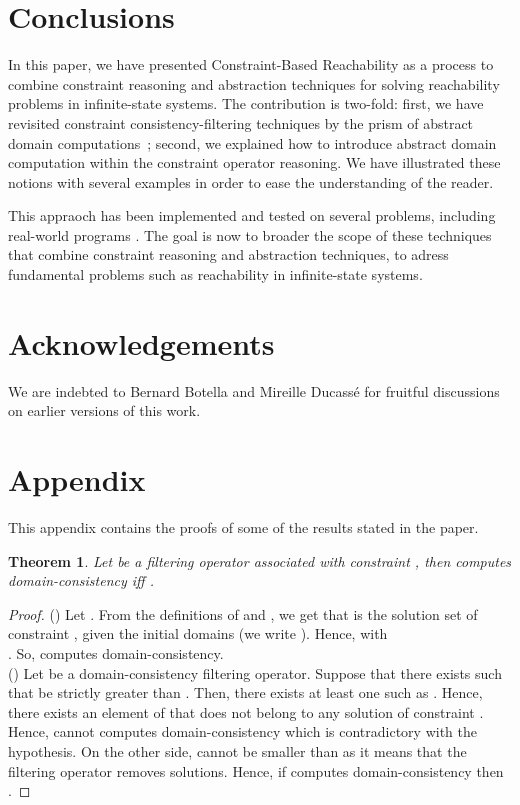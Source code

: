 \documentclass[submission,copyright,creativecommons]{eptcs}
\newtheorem{theorem}{Theorem}
\newtheorem{proof}{Proof}
\begin{document}
\section{Conclusions}

In this paper, we have presented Constraint-Based Reachability as a process to combine constraint reasoning and abstraction techniques for solving reachability problems in infinite-state systems. The contribution is two-fold: first, we have revisited constraint consistency-filtering techniques by the prism of abstract domain computations~; second, we explained how to introduce abstract domain computation within the  constraint operator reasoning. We have illustrated these notions with several examples in order to ease the understanding of the reader.

This appraoch has been implemented and tested on several problems, including real-world programs \cite{Got09,Got12}. The goal is now to broader the scope of these techniques that combine constraint reasoning and abstraction techniques, to adress fundamental problems such as reachability in infinite-state systems.  


\section*{Acknowledgements}
We are indebted to Bernard Botella and Mireille Ducass\'e for fruitful discussions on earlier versions of this work.

\section*{Appendix}
This appendix contains the proofs of some of the results stated in the paper.
\bigskip

\begin{theorem}
\label{theo:arc}
  Let  be a filtering operator associated with constraint , then  computes domain-consistency iff
  . 
\end{theorem}

\begin{proof}
  () Let . From the definitions of
   and , we get that  is the solution set of constraint ,
  given the initial domains  (we write ).  Hence,  with \\.
  So,  computes domain-consistency.\\
  () Let  be a domain-consistency filtering operator. 
  Suppose that there exists  such that 
   be strictly greater than
  .  Then, there exists at least 
  one  such as . Hence, there exists an
  element  of  that does not belong to any solution of constraint . 
  Hence,  cannot computes domain-consistency which is contradictory with the hypothesis.
  On the other side,  cannot be smaller than
   as it means that the filtering operator removes solutions.
  Hence, if  computes domain-consistency then .
 
\end{proof}
\end{document}

